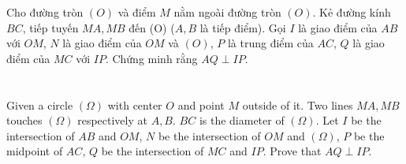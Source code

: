 \documentclass{article}
\begin{document}
Cho đường tròn $(O)$ và điểm $M$ nằm ngoài đường tròn $(O)$. Kẻ đường kính $BC$, tiếp tuyến $MA, MB$ đến (O) ($A, B$ là tiếp điểm). Gọi $I$ là giao điểm của $AB$ với $OM$, $N$ là giao điểm của $OM$ và $(O)$, $P$ là trung điểm của $AC$, $Q$ là giao điểm của $MC$ với $IP$. Chứng minh rằng $AQ \perp IP$.
\\ \\
\\

Given a circle $(\Omega)$ with center $O$ and point $M$ outside of it. Two lines $MA, MB$ touches $(\Omega)$ respectively at $A, B$. $BC$ is the diameter of $(\Omega)$. Let $I$ be the intersection of $AB$ and $OM$, $N$ be the intersection of $OM$ and $(\Omega)$, $P$ be the midpoint of $AC$, $Q$ be the intersection of $MC$ and $IP$. Prove that $AQ \perp IP$.
\end{document}
